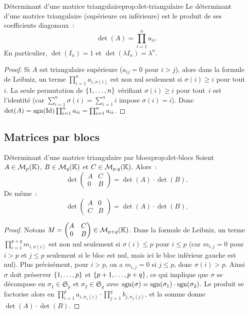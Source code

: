 \begin{proposition}{Déterminant d'une matrice triangulaire}{prop:det-triangulaire}
  Le déterminant d'une matrice triangulaire
  (supérieure ou inférieure) est le produit de ses coefficients
  diagonaux~:
  \[
    \det(A)=\prod_{i=1}^{n}a_{ii}.
  \]
  En particulier, $\det(I_n)=1$ et $\det(\lambda I_n)=\lambda^n$.
\end{proposition}

\begin{proof}
  Si $A$ est triangulaire supérieure ($a_{ij}=0$ pour $i>j$), alors dans
  la formule de Leibniz, un terme $\prod_{i=1}^n a_{i,\sigma(i)}$ est
  non nul seulement si $\sigma(i)\geq i$ pour tout~$i$. La seule
  permutation de $\left\{1,\ldots,n\right\}$ vérifiant $\sigma(i)\geq i$ pour
  tout~$i$ est l'identité (car $\sum_{i=1}^n \sigma(i)=\sum_{i=1}^n i$
  impose $\sigma(i)=i$). Donc
  $\det(A)=\operatorname{sgn}(\operatorname{Id})\prod_{i=1}^n a_{ii}=\prod_{i=1}^n a_{ii}$.
\end{proof}

\subsection{Matrices par blocs}\label{subsec:det-blocs}

\begin{proposition}{Déterminant d'une matrice triangulaire par blocs}{prop:det-blocs}
  Soient $A\in\mathcal{M}_p({\mathbb{K}})$, $B\in\mathcal{M}_q({\mathbb{K}})$ et $C\in\mathcal{M}_{p,q}({\mathbb{K}})$.
  Alors~:
  \[
    \det\begin{pmatrix}A&C\\0&B\end{pmatrix}=\det(A)\cdot\det(B).
  \]
  De même~:
  \[
    \det\begin{pmatrix}A&0\\C&B\end{pmatrix}=\det(A)\cdot\det(B).
  \]
\end{proposition}

\begin{proof}
  Notons $M=\begin{pmatrix}A&C\\0&B\end{pmatrix}\in\mathcal{M}_{p+q}({\mathbb{K}})$.
  Dans la formule de Leibniz, un terme
  $\prod_{i=1}^{p+q}m_{i,\sigma(i)}$ est non nul seulement si
  $\sigma(i)\leq p$ pour $i\leq p$ (car $m_{i,j}=0$ pour $i>p$ et
  $j\leq p$ seulement si le bloc est nul, mais ici le bloc inférieur
  gauche est nul). Plus précisément, pour $i>p$, on a $m_{i,j}=0$ si
  $j\leq p$, donc $\sigma(i)>p$. Ainsi $\sigma$ doit préserver
  $\left\{1,\ldots,p\right\}$ et $\left\{p+1,\ldots,p+q\right\}$, ce qui implique que
  $\sigma$ se décompose en $\sigma_1\in\mathfrak{S}_p$ et
  $\sigma_2\in\mathfrak{S}_q$ avec
  $\operatorname{sgn}(\sigma)=\operatorname{sgn}(\sigma_1)\cdot\operatorname{sgn}(\sigma_2)$. Le produit se
  factorise alors en
  $\prod_{i=1}^{p}a_{i,\sigma_1(i)}\cdot\prod_{j=1}^{q}b_{j,\sigma_2(j)}$,
  et la somme donne $\det(A)\cdot\det(B)$.
\end{proof}

